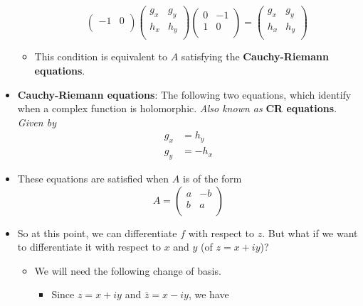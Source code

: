 \documentclass[../notes.tex]{subfiles}
\begin{document}
\begin{itemize}
\begin{itemize}
\begin{equation*}
\begin{pmatrix}
                -1 & 0\\
            \end{pmatrix}
            \begin{pmatrix}
                g_x & g_y\\
                h_x & h_y\\
            \end{pmatrix}
            \begin{pmatrix}
                0 & -1\\
                1 & 0\\
            \end{pmatrix}
            =
            \begin{pmatrix}
                g_x & g_y\\
                h_x & h_y\\
            \end{pmatrix}
        \end{equation*}
        \item This condition is equivalent to $A$ satisfying the \textbf{Cauchy-Riemann equations}.
    \end{itemize}
    \item \textbf{Cauchy-Riemann equations}: The following two equations, which identify when a complex function is holomorphic. \emph{Also known as} \textbf{CR equations}. \emph{Given by}
    \begin{align*}
        g_x &= h_y\\
        g_y &= -h_x
    \end{align*}
    \item These equations are satisfied when $A$ is of the form
    \begin{equation*}
        A =
        \begin{pmatrix}
            a & -b\\
            b & a\\
        \end{pmatrix}
    \end{equation*}
    \item So at this point, we can differentiate $f$ with respect to $z$. But what if we want to differentiate it with respect to $x$ and $y$ (of $z=x+iy$)?
    \begin{itemize}
        \item We will need the following change of basis.
        \begin{itemize}
            \item Since $z=x+iy$ and $\bar{z}=x-iy$, we have

\end{itemize}
\end{itemize}
\end{itemize}
\end{document}

